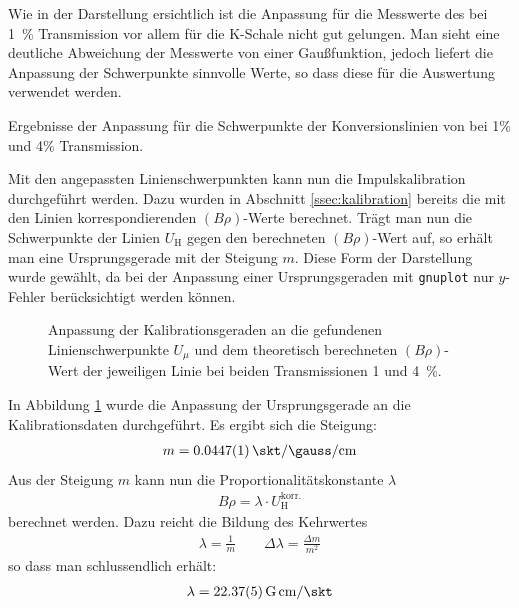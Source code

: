 \documentclass[11pt, a4paper]{article}
\numberwithin{equation}{section}
\begin{document}
Wie in der Darstellung ersichtlich ist die Anpassung für die Messwerte des bei \SI{1}{\percent} Transmission vor allem für die K-Schale nicht gut gelungen.
Man sieht eine deutliche Abweichung der Messwerte von einer Gaußfunktion, jedoch liefert die Anpassung der Schwerpunkte sinnvolle Werte, so dass diese für die Auswertung verwendet werden.
\begin{table}[h]
	\centering
	
	\caption{Ergebnisse der Anpassung für die Schwerpunkte der Konversionslinien von  bei 1\% und 4\% Transmission.}
	\label{tab:fitergebnisse_ba}
\end{table}
Mit den angepassten Linienschwerpunkten kann nun die Impulskalibration durchgeführt werden.
Dazu wurden in Abschnitt \ref{ssec:kalibration} bereits die mit den Linien korrespondierenden $(B \rho)$-Werte berechnet.
Trägt man nun die Schwerpunkte der Linien $U_\mathrm{H}$ gegen den berechneten $(B \rho)$-Wert auf, so erhält man eine Ursprungsgerade mit der Steigung $m$.
Diese Form der Darstellung wurde gewählt, da bei der Anpassung einer Ursprungsgeraden mit \texttt{gnuplot} nur $y$-Fehler berücksichtigt werden können.
\begin{figure}[h]
	\centering
	
	\caption{Anpassung der Kalibrationsgeraden an die gefundenen Linienschwerpunkte $U_\mu$ und dem theoretisch berechneten $(B \rho)$-Wert der jeweiligen Linie bei beiden Transmissionen \num{1} und \SI{4}{\percent}.}
	\label{fig:kalibration}
\end{figure}
In Abbildung \ref{fig:kalibration} wurde die Anpassung der Ursprungsgerade  an die Kalibrationsdaten durchgeführt.
Es ergibt sich die Steigung:
\begin{align}
	m = \SI{0.0447 +- 0.0001}{\skt\per \gauss \per \centi\metre}
\end{align}
Aus der Steigung $m$ kann nun die Proportionalitätskonstante $\lambda$
\begin{align}
	B \rho = \lambda \cdot U_\mathrm{H}^\mathrm{korr.}
\end{align}
berechnet werden.
Dazu reicht die Bildung des Kehrwertes
\begin{align}
	\lambda = \frac{1}{m} \qquad \Delta \lambda = \frac{\Delta m}{m^2}
\end{align}
so dass man schlussendlich erhält:
\begin{align}
	\lambda = \SI{22.37 +- 0.05}{G.cm\per\skt}
\end{align}
\end{document}
